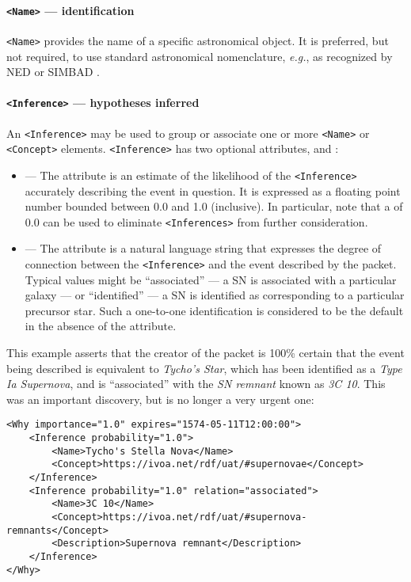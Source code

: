 \documentclass[11pt,a4paper]{ivoa}
\begin{document}
\paragraph{\texttt{<Name>} --- identification}\label{sec:3.6.5}
\verb|<Name>| provides the name of a specific astronomical object. It is
preferred, but not required, to use standard astronomical nomenclature,
\emph{e.g.}, as recognized by NED \citep{bib22} or SIMBAD \citep{bib23}.

\paragraph{\texttt{<Inference>} --- hypotheses inferred}\label{sec:3.6.6}
An \verb|<Inference>| may be used to group or associate one or more \verb|<Name>|
or \verb|<Concept>| elements. \verb|<Inference>| has two optional
attributes,  and :
\begin{itemize}
\item {}\label{sec:3.6.6.1} --- The
 attribute is an estimate of the likelihood of the \verb|<Inference>|
accurately describing the event in question. It is expressed as a floating point
number bounded between 0.0 and 1.0 (inclusive). In particular, note that
a  of 0.0 can be used to eliminate \verb|<Inferences>| from further
consideration.
\item {}\label{sec:3.6.6.2} --- The 
attribute is a natural language string that expresses the degree of connection
between the \verb|<Inference>| and the event described by the packet. Typical
values might be ``associated'' --- a SN is associated with a particular galaxy
--- or ``identified'' --- a SN is identified as corresponding to a particular
precursor star. Such a one-to-one identification is considered to be the default
 in the absence of the attribute.
\end{itemize}

This example asserts that the creator of the packet is 100\% certain that the
event being described is equivalent to \emph{Tycho's Star}, which has been
identified as a \emph{Type Ia Supernova}, and is ``associated'' with the
\emph{SN remnant} known as \emph{3C 10}. This was an important discovery, but
is no longer a very urgent one:
\begin{lstlisting}
<Why importance="1.0" expires="1574-05-11T12:00:00">
    <Inference probability="1.0">
        <Name>Tycho's Stella Nova</Name>
        <Concept>https://ivoa.net/rdf/uat/#supernovae</Concept>
    </Inference>
    <Inference probability="1.0" relation="associated">
        <Name>3C 10</Name>
        <Concept>https://ivoa.net/rdf/uat/#supernova-remnants</Concept>
        <Description>Supernova remnant</Description>
    </Inference>
</Why>
\end{lstlisting}
\end{document}
